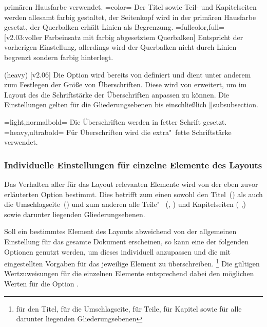 \begin{DeclareEntity*}{}
\begin{DeclareEntity*}{}
\begin{DeclareEntity*}{}
\begin{Declaration}
\begin{DeclareValues}
  primären Hausfarbe verwendet.
\itemval=color=
  Der Titel sowie Teil- und Kapitelseiten werden allesamt farbig gestaltet, 
  der Seitenkopf wird in der primären Hausfarbe  gesetzt, der 
  Querbalken erhält Linien als Begrenzung.
\itemval=fullcolor,full=%
    [v2.03:voller Farbeinsatz mit farbig abgesetztem Querbalken]
  Entspricht der vorherigen Einstellung, allerdings wird der Querbalken nicht 
  durch Linien begrenzt sondern farbig hinterlegt.
\end{DeclareValues}
\end{Declaration}
\newcommand*\cdalias{false,true,lightcolor,barcolor,bicolor,color,fullcolor}

\begin{Declaration}
  {}
  (heavy)
  [v2.06]
Die Option  wird bereits von \KOMAScript definiert und 
dient unter anderem zum Festlegen der Größe von Überschriften. Diese wird von 
\TUDScript erweitert, um im Layout des \CDs die Schriftstärke der Überschriften 
anpassen zu können. Die Einstellungen gelten für die Gliederungsebenen bis 
einschließlich \Macro||{subsubsection}.
%
\begin{DeclareValues}
\itemval=light,normalbold=
  Die Überschriften werden in fetter Schrift gesetzt.
\itemval=heavy,ultrabold=
  Für Überschriften wird die extra"~fette Schriftstärke verwendet.
\end{DeclareValues}
\end{Declaration}



\subsubsection{Individuelle Einstellungen für einzelne Elemente des Layouts}
%
Das Verhalten aller für das Layout relevanten Elemente wird von der eben zuvor 
erläuterten Option  bestimmt. Dies betrifft zum einen sowohl 
den Titel~() als auch die Umschlagseite~() 
und zum anderen alle Teile"~ (, ) und Kapitelseiten 
( ,) sowie darunter liegenden Gliederungsebenen.

Soll ein bestimmtes Element des Layouts abweichend von der allgemeinen 
Einstellung für das gesamte Dokument erscheinen, so kann eine der folgenden 
Optionen genutzt werden, um dieses individuell anzupassen und die mit 
 eingestellten Vorgaben für das jeweilige Element zu 
überschreiben.%
\footnote{%
   für den Titel,  für die Umschlagseite,
   für Teile,  für Kapitel sowie
   für alle darunter liegenden Gliederungsebenen%
}
Die gültigen Wertzuweisungen für die einzelnen Elemente entsprechend dabei den 
möglichen Werten für die Option . 


\end{DeclareEntity*}
\end{DeclareEntity*}
\end{DeclareEntity*}
